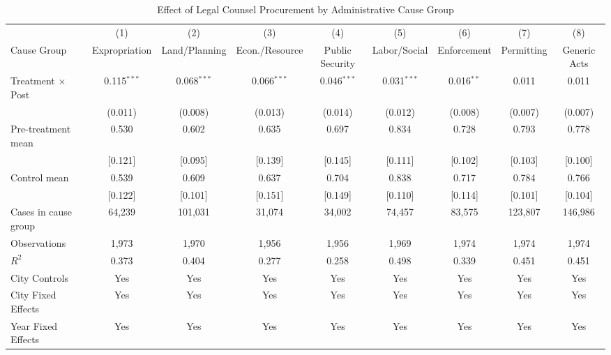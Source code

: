 \begin{table}[!htbp]
\setlength{\abovecaptionskip}{0pt}
\centering
\caption{Effect of Legal Counsel Procurement by Administrative Cause Group}
\label{tab:admin_by_cause}
\begin{threeparttable}
\begin{tabular}{lcccccccc}
\toprule
 & (1) & (2) & (3) & (4) & (5) & (6) & (7) & (8) \\
Cause Group & Expropriation & Land/Planning & Econ./Resource & Public Security & Labor/Social & Enforcement & Permitting & Generic Acts \\
\midrule
Treatment $\times$ Post & 0.115$^{***}$ & 0.068$^{***}$ & 0.066$^{***}$ & 0.046$^{***}$ & 0.031$^{***}$ & 0.016$^{**}$ & 0.011 & 0.011 \\
& (0.011) & (0.008) & (0.013) & (0.014) & (0.012) & (0.008) & (0.007) & (0.007) \\
\addlinespace
Pre-treatment mean & 0.530 & 0.602 & 0.635 & 0.697 & 0.834 & 0.728 & 0.793 & 0.778 \\
& [0.121] & [0.095] & [0.139] & [0.145] & [0.111] & [0.102] & [0.103] & [0.100] \\
Control mean & 0.539 & 0.609 & 0.637 & 0.704 & 0.838 & 0.717 & 0.784 & 0.766 \\
& [0.122] & [0.101] & [0.151] & [0.149] & [0.110] & [0.114] & [0.101] & [0.104] \\
\addlinespace
Cases in cause group & 64,239 & 101,031 & 31,074 & 34,002 & 74,457 & 83,575 & 123,807 & 146,986 \\
Observations & 1,973 & 1,970 & 1,956 & 1,956 & 1,969 & 1,974 & 1,974 & 1,974 \\
$R^2$ & 0.373 & 0.404 & 0.277 & 0.258 & 0.498 & 0.339 & 0.451 & 0.451 \\
City Controls & Yes & Yes & Yes & Yes & Yes & Yes & Yes & Yes \\
City Fixed Effects & Yes & Yes & Yes & Yes & Yes & Yes & Yes & Yes \\
Year Fixed Effects & Yes & Yes & Yes & Yes & Yes & Yes & Yes & Yes \\
\bottomrule
\end{tabular}
\begin{tablenotes}[flushleft]
\footnotesize

\end{tablenotes}
\end{threeparttable}
\end{table}
